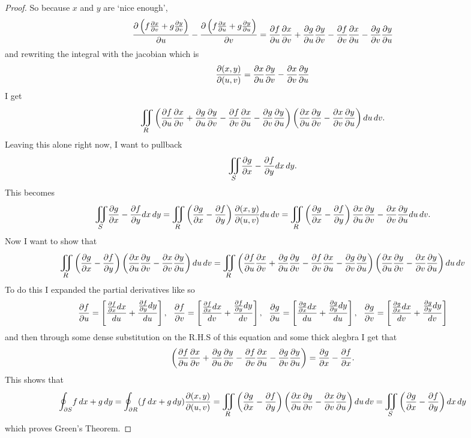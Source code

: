 \documentclass[titlepage]{article}
\begin{document}
\begin{proof}
So because $x$ and $y$ are `nice enough',
$$\frac{\partial \left(f\frac{\partial x}{\partial v} + g\frac{\partial y}{\partial v}\right)}{\partial u} -  \frac{\partial \left(f\frac{\partial x}{\partial u} + g\frac{\partial y}{\partial u}\right)}{\partial v}  = \frac{\partial f}{\partial u}\frac{\partial x}{\partial v} + \frac{\partial g}{\partial u} \frac{\partial y}{\partial v} - \frac{\partial f}{\partial v}\frac{\partial x}{\partial u} - \frac{\partial g}{\partial v} \frac{\partial y}{\partial u}$$
and rewriting the integral with the jacobian which is
$$\frac{\partial(x,y)}{\partial(u,v)} = \frac{\partial x}{\partial u}\frac{\partial y}{\partial v} - \frac{\partial x}{\partial v}\frac{\partial y}{\partial u}$$
I get
$$ \bigiint{R}{}  \left(\frac{\p f}{\p u}\frac{\p x}{\p v} + \frac{\p g}{\p u} \frac{\p y}{\p v} - \frac{\p f}{\p v}\frac{\p x}{\p u} - \frac{\p g}{\p v} \frac{\p y}{\p u}\right)\left( \frac{\p x}{\p u}\frac{\p y}{\p v} - \frac{\p x}{\p v}\frac{\p y}{\p u} \right)du\,dv.$$
Leaving this alone right now, I want to pullback
$$ \bigiint{S}{} \frac{\p g}{\p x} - \frac{\p f}{\p y} dx\,dy.$$
This becomes
$$\bigiint{S}{} \frac{\p g}{\p x} - \frac{\p f}{\p y} dx\,dy = \bigiint{R}{} \left(\frac{\p g}{\p x} - \frac{\p f}{\p y}\right) \frac{\p(x,y)}{\p(u,v)}du\,dv =  \bigiint{R}{} \left(\frac{\p g}{\p x} - \frac{\p f}{\p y}\right) \frac{\p x}{\p u}\frac{\p y}{\p v} - \frac{\p x}{\p v}\frac{\p y}{\p u}du\,dv.$$
Now I want to show that
$$ \bigiint{R}{} \left(\frac{\p g}{\p x} - \frac{\p f}{\p y}\right) \left(\frac{\p x}{\p u}\frac{\p y}{\p v} - \frac{\p x}{\p v}\frac{\p y}{\p u}\right)du\,dv =  \bigiint{R}{}  \left(\frac{\p f}{\p u}\frac{\p x}{\p v} + \frac{\p g}{\p u} \frac{\p y}{\p v} - \frac{\p f}{\p v}\frac{\p x}{\p u} - \frac{\p g}{\p v} \frac{\p y}{\p u}\right)\left( \frac{\p x}{\p u}\frac{\p y}{\p v} - \frac{\p x}{\p v}\frac{\p y}{\p u} \right)du\,dv$$
To do this I expanded the partial derivatives like so
$$\frac{\partial f}{\partial u}  = \left[\frac{\frac{\partial f}{\partial x}dx}{du} + \frac{\frac{\partial f}{\partial y}dy}{du} \right], \ \
\frac{\partial f}{\partial v}  = \left[\frac{\frac{\partial f}{\partial x}dx}{dv} + \frac{\frac{\partial f}{\partial y}dy}{dv}\right], \ \
\frac{\partial g}{\partial u}  = \left[\frac{\frac{\partial g}{\partial x}dx}{du} + \frac{\frac{\partial g}{\partial y}dy}{du}\right] , \ \
\frac{\partial g}{\partial v}  =\left[\frac{\frac{\partial g}{\partial x}dx}{dv} + \frac{\frac{\partial g}{\partial y}dy}{dv}\right] $$
and then through some dense substitution on the R.H.S of this equation and some thick alegbra I get that 
$$\left(\frac{\partial f}{\partial u}\frac{\partial x}{\partial v} + \frac{\partial g}{\partial u} \frac{\partial y}{\partial v} - \frac{\partial f}{\partial v}\frac{\partial x}{\partial u} - \frac{\partial g}{\partial v} \frac{\partial y}{\partial u}\right) = \frac{\partial g}{\partial x} - \frac{\partial f}{\partial x}.$$
This shows that 
$$ \mathlarger\oint_{\p S}f\,dx + g\,dy = \mathlarger\oint_{\p R}(f\,dx + g\,dy) \frac{\p (x,y)}{\p (u,v)} =  \bigiint{R}{} \left(\frac{\p g}{\p x} - \frac{\p f}{\p y}\right) \left(\frac{\p x}{\p u}\frac{\p y}{\p v} - \frac{\p x}{\p v}\frac{\p y}{\p u}\right)du\,dv = \bigiint{S}{}\left(\frac{\p g}{\p x} - \frac{\p f}{\p y}\right)dx\,dy$$
which proves Green's Theorem.
\end{proof}
\end{document}
